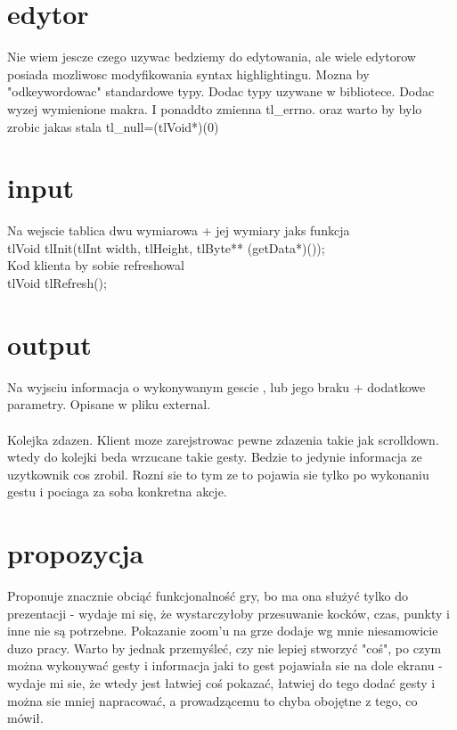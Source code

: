 \documentclass[10pt,a4paper]{article}
\begin{document}
\section{edytor}
Nie wiem jescze czego uzywac bedziemy do edytowania, ale wiele edytorow posiada mozliwosc modyfikowania syntax highlightingu. Mozna by "odkeywordowac" standardowe typy. Dodac typy uzywane w bibliotece. Dodac wyzej wymienione makra.
I ponaddto zmienna tl_errno. oraz warto by bylo zrobic jakas stala tl_null=(tlVoid*)(0)


\section{input}

Na wejscie tablica dwu wymiarowa + jej wymiary
jaks funkcja\\
tlVoid tlInit(tlInt width, tlHeight, tlByte** (getData*)());\\
Kod klienta by sobie refreshowal\\
tlVoid tlRefresh();

\section{output}

Na wyjsciu informacja o wykonywanym gescie , lub jego braku + dodatkowe parametry. Opisane w pliku external. \\\\

Kolejka zdazen. Klient moze zarejstrowac pewne zdazenia takie jak scrolldown. wtedy do kolejki beda wrzucane takie gesty. Bedzie to jedynie informacja ze uzytkownik cos zrobil. Rozni sie to tym ze to pojawia sie tylko po wykonaniu gestu i pociaga za soba konkretna akcje.

\section{propozycja}

Proponuje znacznie obciąć funkcjonalność gry, bo ma ona służyć tylko do prezentacji - wydaje mi się, że wystarczyłoby przesuwanie kocków, czas, punkty i inne nie są potrzebne.
Pokazanie zoom'u na grze dodaje wg mnie niesamowicie duzo pracy.
Warto by jednak przemyśleć, czy nie lepiej stworzyć "coś", po czym można wykonywać gesty i informacja jaki to gest pojawiała sie na dole ekranu - wydaje mi sie, że
wtedy jest łatwiej coś pokazać, łatwiej do tego dodać gesty i można sie mniej napracować, a prowadzącemu to chyba obojętne z tego, co mówił.
\end{document}
